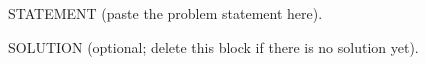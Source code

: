 %
\begin{problem}
    STATEMENT (paste the problem statement here).
\end{problem}
\begin{solution}
    SOLUTION (optional; delete this block if there is no solution yet).
\end{solution}
